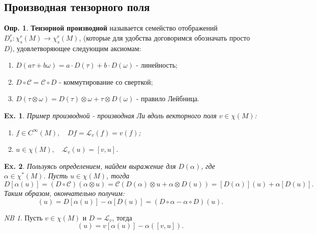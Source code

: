 \documentclass[12pt]{article}
\theoremstyle{plain}
\theoremstyle{lemma}
\theoremstyle{corollary}
\theoremstyle{proposition}
\theoremstyle{exercise}
\theoremstyle{example}
\newtheorem{example}{Ex.}
\theoremstyle{remark}
\newtheorem{remark}{NB}
\theoremstyle{definition}
\newtheorem{definition}{Опр.}
\begin{document}
\subsection{Производная тензорного поля}

\begin{definition}
    \textbf{Тензорной производной} называется семейство отображений $D^r_s: \chi^r_s(M) \to \chi^r_s(M)$, 
    (которые для удобства договоримся обозначать просто $D$), удовлетворяющее следующим аксиомам:
    \begin{enumerate}
        \item $D(a \tau + b \omega) = a \cdot D(\tau) + b \cdot D(\omega)$ - линейность;
        \item $D \circ \mathcal{C} = \mathcal{C} \circ D$ - коммутирование со сверткой;
        \item $D(\tau \otimes \omega) = D(\tau) \otimes \omega + \tau \otimes D(\omega)$ - правило Лейбница.
    \end{enumerate}
\end{definition}

\begin{example}
    Пример производной - производная Ли вдоль векторного поля $v \in \chi(M)$:
    \begin{enumerate}
        \item $f \in C^\infty(M), \quad Df = \mathcal{L}_v(f) = v(f)$;
        \item $u \in \chi(M), \quad \mathcal{L}_v(u) = [v,u]$.
    \end{enumerate}
\end{example}

\begin{example}
    Пользуясь определением, найдем выражение для $D(\alpha)$, где $\alpha \in \chi^\ast(M)$. Пусть 
    $u \in \chi(M)$, тогда
    \begin{equation*}
        D[\alpha(u)] = (D \circ \mathcal{C})(\alpha \otimes u) = 
        \mathcal{C}(D(\alpha) \otimes u + \alpha \otimes D(u)) = 
        [D(\alpha)](u) + \alpha[D(u)].
    \end{equation*}
    Таким образом, окончательно получим:
    \begin{equation*}
        [D(\alpha)](u) = D[\alpha(u)] - \alpha[D(u)] = (D \circ \alpha - \alpha \circ D)(u).
    \end{equation*}
\end{example}

\begin{remark}
    Пусть $v \in \chi(M)$ и $D = \mathcal{L}_v$, тогда 
    \begin{equation*}
        [\mathcal{L}_v(\alpha)](u) = v[\alpha(u)] - \alpha([v,u]).
    \end{equation*}
\end{remark}
\end{document}
